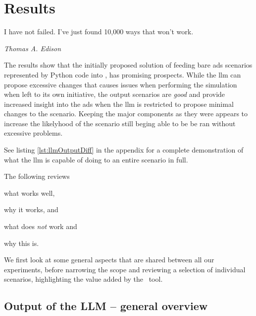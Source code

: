 \chapter{Results}\label{chp:results}

\epigraph{I have not failed. I've just found 10,000 ways that won't work.}{\textit{Thomas A.
        Edison}}

The results show that the initially proposed solution of feeding bare
\acrshort{ads} scenarios represented by Python code into , has promising prospects.
While the \acrshort{llm} can propose excessive changes that causes issues when performing the
simulation when left to its own initiative, the output scenarios are \emph{good} and provide
increased insight into the \acrshort{ads} when the \acrshort{llm} is restricted to propose minimal
changes to the scenario. Keeping the major components as they were appears to increase the
likelyhood of the scenario still beging able to be be ran without excessive problems.

See listing \ref{lst:llmOutputDiff} in the  appendix for a complete
demonstration of what the \acrlong{llm} is capable of doing to an entire scenario in full.

The following reviews \begin{inparaenum}
    \item what works well,
    \item why it works, and
    \item what does \emph{not} work and
    \item why this is.
\end{inparaenum} We first look at some general aspects that are shared between all our experiments, before narrowing
the scope and reviewing a selection of individual scenarios, highlighting the value added by the
\hefe~tool.



\section{Output of the LLM -- general overview}

